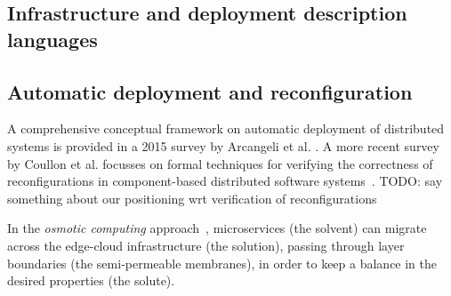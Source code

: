 \documentclass[conference]{IEEEtran}
\newcommand{\meta}[1]{{\color{blue}#1}}
\begin{document}
\subsection{Infrastructure and deployment description languages}
\label{sec:rw:depdesc}

\subsection{Automatic deployment and reconfiguration}
\label{sec:rw:autodep}
%
A comprehensive conceptual framework
 on automatic deployment of distributed systems
 is provided in a 2015 survey by Arcangeli et al. \cite{DBLP:journals/jss/ArcangeliBL15}.
%
A more recent survey by Coullon et al. focusses
 on formal techniques for verifying the correctness of reconfigurations
 in component-based distributed software systems~\cite{coullon2023swreconfig}.
%
\meta{TODO: say something about our positioning wrt verification of reconfigurations}

In the \emph{osmotic computing} approach~\cite{DBLP:journals/computer/VillariFDRJR19},
 microservices (the solvent)
 can migrate across 
 the edge-cloud infrastructure (the solution),
 passing through layer boundaries (the semi-permeable membranes),
 in order to keep a balance in the desired properties (the solute).
\end{document}

